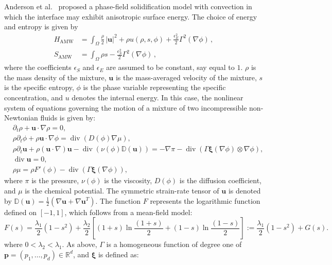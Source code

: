 \documentclass[11pt]{article}
\def\bfu{\mathbf{u}}
\def\bfxi{\boldsymbol{\xi}}
\begin{document}
Anderson et al.\ \cite{anderson2000phase} proposed a phase-field solidification model with convection in which the interface may exhibit anisotropic surface energy. The choice of energy and entropy is given by
\begin{align*}
H_{\mathrm{AMW}} &= \int_{\Omega} \frac{\rho}{2}\, |\bfu|^2 + \rho u(\rho,s,\phi) 
+ \frac{\epsilon_E^2}{2}\Gamma^2(\nabla \phi)\,, \\
S_{\mathrm{AMW}} &= \int_{\Omega} \rho s - \frac{\epsilon_S^2}{2} \Gamma^2(\nabla \phi)\,,
\end{align*}
where the coefficients $\epsilon_S$ and $\epsilon_E$ are assumed to be constant, say equal to $1$. $\rho$ is the mass  density of the mixture, $\mathbf{u}$ is the mass-averaged velocity of the mixture, $s$ is the specific entropy, $\phi$  is the phase variable representing the specific concentration, and $u$ denotes the internal energy. In this case, the nonlinear system of equations governing the motion of a mixture of two incompressible non-Newtonian fluids is given by:
\begin{align}
&\partial_t \rho + \mathbf{u} \cdot \nabla \rho = 0, \label{rho} \\
&\rho \partial_t \phi + \rho \mathbf{u} \cdot \nabla \phi = \operatorname{div} (D(\phi) \nabla \mu), \label{phi} \\
&\rho \partial_t \mathbf{u} + \rho (\mathbf{u} \cdot \nabla) \mathbf{u} - \operatorname{div}(\nu(\phi) \mathbb{D}(\mathbf{u})) = -\nabla \pi - \operatorname{div}(\Gamma \mathbf{\bfxi}(\nabla\phi) \otimes \nabla \phi), \label{velocity_S} \\
&{ \operatorname{div}\bfu = 0,}\label{Eq3}
\\
&\rho \mu = \rho F'(\phi) - \operatorname{div}(\Gamma \mathbf{\bfxi}(\nabla\phi)), \label{mu}
\end{align}
where $\pi$ is the pressure, $\nu(\phi)$ is the viscosity, $D(\phi)$ is the diffusion coefficient, and $\mu$ is the chemical potential. The symmetric strain-rate tensor of $\mathbf{u}$ is denoted by $\mathbb{D}(\mathbf{u}) = \frac{1}{2}(\nabla \mathbf{u} + \nabla \mathbf{u}^{T})$. The function $F$ represents the logarithmic function defined on $[-1,1]$, which follows from a mean-field model:
\[
F(s) = \frac{\lambda_1}{2}(1- s^2) + \frac{\lambda_2}{2}\left[(1+s) \ln \frac{(1+s)}{2}+(1-s) \ln \frac{(1-s)}{2}\right] := \frac{\lambda_1}{2}(1- s^2) + G(s).\label{log_pot}
\]
where $0<\lambda_2<\lambda_1$. As above, $\Gamma$ is a homogeneous function of degree one of $\mathbf{p} = (p_1, \ldots, p_d) \in \mathbb{R}^d$, and $\bfxi$ is defined as:
\end{document}
